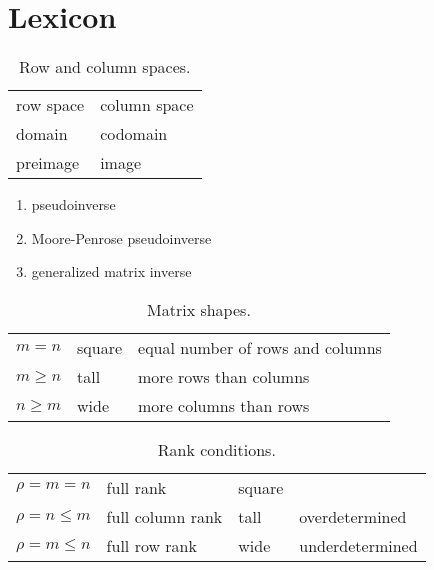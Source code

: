 \chapter{Lexicon}

\begin{table}[htbp]
\caption[Row and column spaces]{Row and column spaces.}
\begin{center}
\begin{tabular}{ll}
%
  row space & column space \\
  domain    & codomain \\
  preimage  & image \\
%
\end{tabular}
\end{center}
\label{tab:appendix:jargon}
\end{table}
\begin{enumerate}
%
  \item pseudoinverse
  \item Moore-Penrose pseudoinverse
  \item generalized matrix inverse
%
\end{enumerate}
\begin{table}[htbp]
\caption[Matrix shapes]{Matrix shapes.}
\begin{center}
\begin{tabular}{lll}
%
  $m=n$ & square & equal number of rows and columns \\
%
  $m\ge n$ & tall & more rows than columns \\
%
  $n\ge m$ & wide & more columns than rows \\
%
\end{tabular}
\end{center}
\label{tab:matrix shapes}
\end{table}

\begin{table}[htbp]
\caption[Rank conditions]{Rank conditions.}
\begin{center}
\begin{tabular}{llll}
%
  $\rho=m=n$ & full rank & square \\
%
  $\rho=n\le m$ & full column rank & tall & overdetermined \\
%
  $\rho=m\le n$ & full row rank & wide & underdetermined \\
%
\end{tabular}
\end{center}
\label{tab:matrix shapes and rank}
\end{table}


\endinput